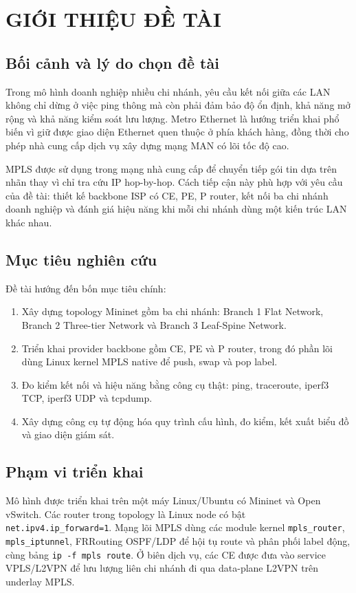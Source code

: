 \section{GIỚI THIỆU ĐỀ TÀI}

\subsection{Bối cảnh và lý do chọn đề tài}

Trong mô hình doanh nghiệp nhiều chi nhánh, yêu cầu kết nối giữa các LAN không chỉ dừng ở việc ping thông mà còn phải đảm bảo độ ổn định, khả năng mở rộng và khả năng kiểm soát lưu lượng. Metro Ethernet là hướng triển khai phổ biến vì giữ được giao diện Ethernet quen thuộc ở phía khách hàng, đồng thời cho phép nhà cung cấp dịch vụ xây dựng mạng MAN có lõi tốc độ cao.

MPLS được sử dụng trong mạng nhà cung cấp để chuyển tiếp gói tin dựa trên nhãn thay vì chỉ tra cứu IP hop-by-hop. Cách tiếp cận này phù hợp với yêu cầu của đề tài: thiết kế backbone ISP có CE, PE, P router, kết nối ba chi nhánh doanh nghiệp và đánh giá hiệu năng khi mỗi chi nhánh dùng một kiến trúc LAN khác nhau.

\subsection{Mục tiêu nghiên cứu}

Đề tài hướng đến bốn mục tiêu chính:
\begin{enumerate}
    \item Xây dựng topology Mininet gồm ba chi nhánh: Branch 1 Flat Network, Branch 2 Three-tier Network và Branch 3 Leaf-Spine Network.
    \item Triển khai provider backbone gồm CE, PE và P router, trong đó phần lõi dùng Linux kernel MPLS native để push, swap và pop label.
    \item Đo kiểm kết nối và hiệu năng bằng công cụ thật: ping, traceroute, iperf3 TCP, iperf3 UDP và tcpdump.
    \item Xây dựng công cụ tự động hóa quy trình cấu hình, đo kiểm, kết xuất biểu đồ và giao diện giám sát.
\end{enumerate}

\subsection{Phạm vi triển khai}

Mô hình được triển khai trên một máy Linux/Ubuntu có Mininet và Open vSwitch. Các router trong topology là Linux node có bật \texttt{net.ipv4.ip\_forward=1}. Mạng lõi MPLS dùng các module kernel \texttt{mpls\_router}, \texttt{mpls\_iptunnel}, FRRouting OSPF/LDP để hội tụ route và phân phối label động, cùng bảng \texttt{ip -f mpls route}. Ở biên dịch vụ, các CE được đưa vào service VPLS/L2VPN để lưu lượng liên chi nhánh đi qua data-plane L2VPN trên underlay MPLS.

